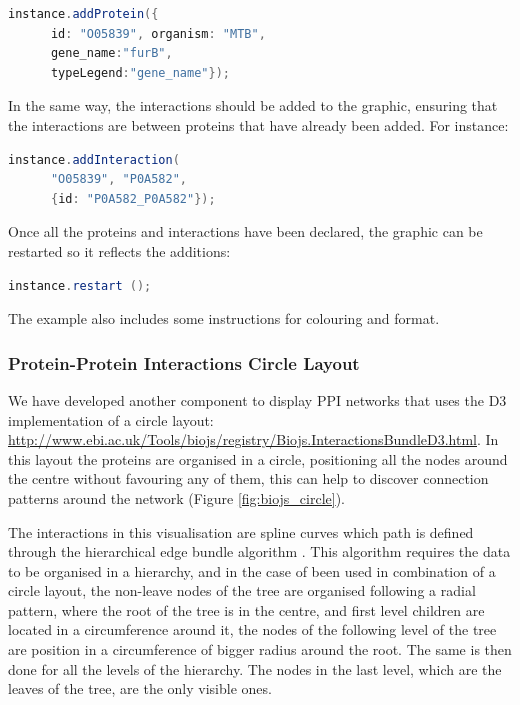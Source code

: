 \begin{lstlisting}[language=java]
instance.addProtein({
      id: "O05839", organism: "MTB",
      gene_name:"furB",
      typeLegend:"gene_name"});
\end{lstlisting}
					
In the same way, the interactions should be added to the graphic, ensuring that the interactions are between proteins that have already been added. For instance:

\begin{lstlisting}[language=java]
instance.addInteraction(
      "O05839", "P0A582",
      {id: "P0A582_P0A582"}); 
\end{lstlisting}
					
Once all the proteins and interactions have been declared, the graphic can be restarted so it reflects the additions:

\begin{lstlisting}[language=java]
instance.restart ();
\end{lstlisting}

The example also includes some instructions for colouring and format. 


\subsubsection{Protein-Protein Interactions Circle Layout} \label{subsubsec:ppi2_biojs}
We have developed another component to display PPI networks that uses the D3 implementation of a circle layout: \url{http://www.ebi.ac.uk/Tools/biojs/registry/Biojs.InteractionsBundleD3.html}. In this layout the proteins are organised in a circle, positioning all the nodes around the centre without favouring any of them, this can help to discover connection patterns around the network (Figure \ref{fig:biojs_circle}). 

The interactions in this visualisation are spline curves which path is defined through the hierarchical edge bundle algorithm \cite{HOL2006}. This algorithm requires the data to be organised in a hierarchy, and in the case of been used in combination of a circle layout, the non-leave nodes of the tree are organised following a radial pattern, where the root of the tree is in the centre, and first level children are located in a circumference around it, the nodes of the following level of the tree are position in a circumference of bigger radius around the root. The same is then done for all the levels of the hierarchy. The nodes in the last level, which are the leaves of the tree, are the only visible ones.

